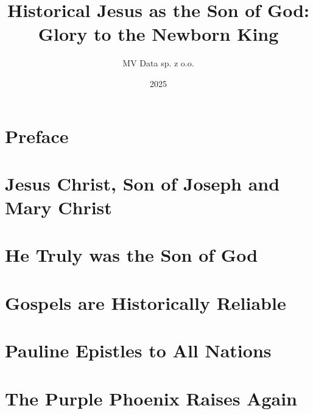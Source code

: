 \documentclass[12pt]{book}
\title{Historical Jesus as the Son of God: Glory to the Newborn King}
\author{MV Data sp.
z o.o.}
\date{2025}
\begin{document}
\maketitle

\tableofcontents

\chapter*{Preface}


\chapter{Jesus Christ, Son of Joseph and Mary Christ}\label{par:ch:jesus-christ-son-of-joseph-and-mary-christ}


\chapter{He Truly was the Son of God}\label{par:ch:he-truly-was-the-son-of-god}


\chapter{Gospels are Historically Reliable}\label{par:ch:gospels-are-historically-reliable}


\chapter{Pauline Epistles to All Nations}\label{par:ch:pauline-epistles-to-all-nations}


\chapter{The Purple Phoenix Raises Again}\label{par:ch:the-purple-phoenix-raises-again}

\end{document}
